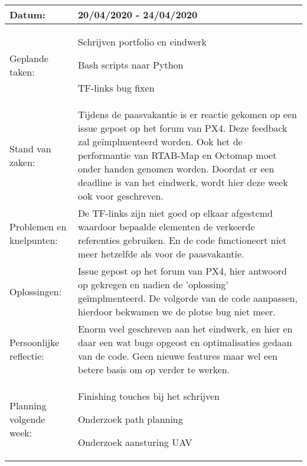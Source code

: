 \begin{tabularx}{\textwidth}{| l | X |}
  \hline
  Datum: & 20/04/2020 - 24/04/2020\\
  \hline
  Geplande taken: &
  \begin{compactitem}
    \item Schrijven portfolio en eindwerk
    \item Bash scripts naar Python
    \item TF-links bug fixen
  \end{compactitem}\\
  \hline
  Stand van zaken: & Tijdens de paasvakantie is er reactie gekomen op een issue gepost op het forum van PX4. Deze feedback zal ge\"implmenteerd worden. Ook het de performantie van RTAB-Map en Octomap moet onder handen genomen worden. Doordat er een deadline is van het eindwerk, wordt hier deze week ook voor geschreven.\\
  \hline
  Problemen en knelpunten: & De TF-links zijn niet goed op elkaar afgestemd waardoor bepaalde elementen de verkeerde referenties gebruiken. En de code functioneert niet meer hetzelfde als voor de paasvakantie.\\
  \hline
  Oplossingen: & Issue gepost op het forum van PX4, hier antwoord op gekregen en nadien de 'oplossing' ge\"implmenteerd. De volgorde van de code aanpassen, hierdoor bekwamen we de plotse bug niet meer.\\
  \hline
  Persoonlijke reflectie: & Enorm veel geschreven aan het eindwerk, en hier en daar een wat bugs opgeost en optimalisaties gedaan van de code. Geen nieuwe features maar wel een betere basis om op verder te werken.\\
  \hline
  Planning volgende week: &
  \begin{compactitem}
    \item Finishing touches bij het schrijven
    \item Onderzoek path planning
    \item Onderzoek aansturing UAV
  \end{compactitem}\\
  \hline
\end{tabularx}